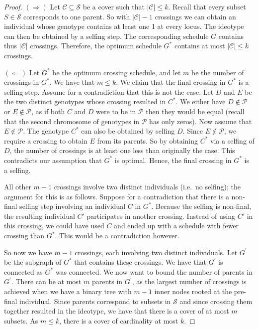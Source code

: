 \documentclass[runningheads]{llncs}
\begin{document}
\begin{proof}
$(\Rightarrow)$ Let $\mathcal{C} \subseteq \mathcal{S}$ be a cover such that
$|\mathcal{C}| \leq k$. Recall that every subset $S \in \mathcal{S}$
corresponds to one parent. So with $|\mathcal{C}| - 1$ crossings we can obtain
an individual whose genotype contains at least one 1 at every locus. The
ideotype can then be obtained by a selfing step. The corresponding schedule $G$
contains thus $|\mathcal{C}|$ crossings. Therefore, the optimum schedule $G^*$
contains at most $|\mathcal{C}| \leq k$ crossings.

$(\Leftarrow)$ Let $G^*$ be the optimum crossing schedule, and let $m$ be the
number of crossings in $G^*$. We have that $m \leq k$. We claim that the final
crossing in $G^*$ is a selfing step. Assume for a contradiction that this is
not the case. Let $D$ and $E$ be the two distinct genotypes whose
crossing resulted in $C^*$. We either have $D \not \in \mathcal{P}$ or $E \not \in
\mathcal{P}$, as if both $C$ and $D$ were to be in $\mathcal{P}$ then they would be equal
(recall that the second chromosome of genotypes in $\mathcal{P}$ has only zeros). Now
assume that $E \not \in \mathcal{P}$. The genotype $C^*$ can also be obtained by
selfing $D$. Since $E \not \in \mathcal{P}$, we require a crossing to obtain $E$
from its parents. So by obtaining $C^*$ via a selfing of $D$, the number of
crossings is at least one less than originally the case. This contradicts our
assumption that $G^*$ is optimal. Hence, the final crossing in $G^*$ is a
selfing.

All other $m - 1$ crossings involve two distinct individuals (i.e.\ no
selfing); the argument for this is as follows. Suppose for a contradiction that
there is a non-final selfing step involving an individual $C$ in $G^*$. Because
the selfing is non-final, the resulting individual $C'$ participates in another
crossing. Instead of using $C'$ in this crossing, we could have used $C$ and
ended up with a schedule with fewer crossing than $G^*$. This would be a
contradiction however.

So now we have $m-1$ crossings, each involving two distinct individuals. Let
$G^\prime$ be the subgraph of $G^*$ that contains these crossings. We have that
$G^\prime$ is connected as $G^*$ was connected. We now want to bound the number
of parents in $G^\prime$. There can be at most $m$ parents in $G^\prime$, as
the largest number of crossings is achieved when we have a binary tree with
$m-1$ inner nodes rooted at the pre-final individual. Since parents
correspond to subsets in $\mathcal{S}$ and since crossing them together
resulted in the ideotype, we have that there is a cover of at most $m$ subsets.
As $m \leq k$, there is a cover of cardinality at most $k$.
\end{proof}
\end{document}
